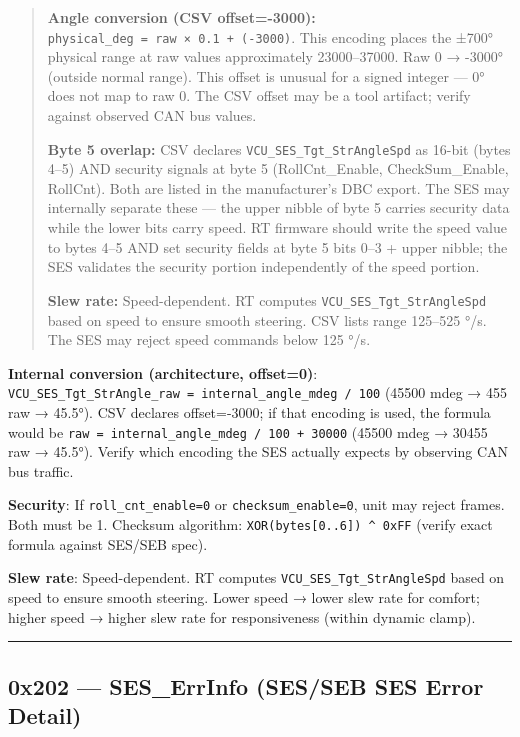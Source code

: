 \begin{quote}
\textbf{Angle conversion (CSV offset=-3000):}
\texttt{physical\_deg\ =\ raw\ ×\ 0.1\ +\ (-3000)}. This encoding places the
±700° physical range at raw values approximately 23000--37000. Raw 0 → -3000°
(outside normal range). This offset is unusual for a signed integer --- 0° does
not map to raw 0. The CSV offset may be a tool artifact; verify against observed
CAN bus values.

\textbf{Byte 5 overlap:} CSV declares \texttt{VCU\_SES\_Tgt\_StrAngleSpd} as
16-bit (bytes 4--5) AND security signals at byte 5 (RollCnt\_Enable,
CheckSum\_Enable, RollCnt). Both are listed in the manufacturer's DBC export.
The SES may internally separate these --- the upper nibble of byte 5 carries
security data while the lower bits carry speed. RT firmware should write the
speed value to bytes 4--5 AND set security fields at byte 5 bits 0--3 + upper
nibble; the SES validates the security portion independently of the speed
portion.

\textbf{Slew rate:} Speed-dependent. RT computes
\texttt{VCU\_SES\_Tgt\_StrAngleSpd} based on speed to ensure smooth steering.
CSV lists range 125--525 °/s. The SES may reject speed commands below 125 °/s.
\end{quote}

\textbf{Internal conversion (architecture, offset=0)}:
\texttt{VCU\_SES\_Tgt\_StrAngle\_raw\ =\ internal\_angle\_mdeg\ /\ 100} (45500
mdeg → 455 raw → 45.5°). CSV declares offset=-3000; if that encoding is used,
the formula would be \texttt{raw\ =\ internal\_angle\_mdeg\ /\ 100\ +\ 30000}
(45500 mdeg → 30455 raw → 45.5°). Verify which encoding the SES actually
expects by observing CAN bus traffic.

\textbf{Security}: If \texttt{roll\_cnt\_enable=0} or
\texttt{checksum\_enable=0}, unit may reject frames. Both must be 1. Checksum
algorithm: \texttt{XOR(bytes{[}0..6{]})\ \^{}\ 0xFF} (verify exact formula
against SES/SEB spec).

\textbf{Slew rate}: Speed-dependent. RT computes
\texttt{VCU\_SES\_Tgt\_StrAngleSpd} based on speed to ensure smooth steering.
Lower speed → lower slew rate for comfort; higher speed → higher slew rate for
responsiveness (within dynamic clamp).

\begin{center}\rule{0.5\linewidth}{0.5pt}\end{center}

\subsection{0x202 --- SES\_ErrInfo (SES/SEB SES Error
Detail)}\label{x202-ses_errinfo-SES/SEB-SES-error-detail}

